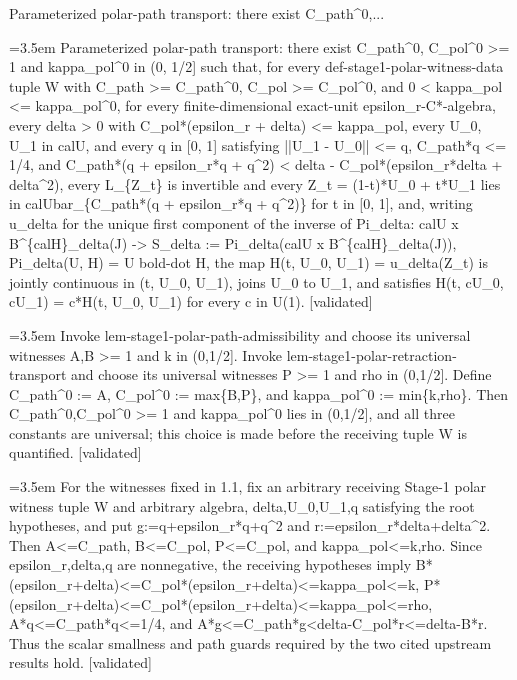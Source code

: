 \documentclass{article}
\newcommand{\step}[1]{\par\noindent\hangindent=3.5em\hangafter=1%
  \makebox[3.5em][l]{\textbf{#1.}}}
\newcommand{\steptag}[1]{\hfill{\small\textsf{[#1]}}}
\begin{document}
\begin{proofbox}{Parameterized polar-path transport: there exist C\_path\textasciicircum{}0,...}
\step{1} Parameterized polar-path transport: there exist C\_path\textasciicircum{}0, C\_pol\textasciicircum{}0 >= 1 and kappa\_pol\textasciicircum{}0 in (0, 1/2] such that, for every def-stage1-polar-witness-data tuple W with C\_path >= C\_path\textasciicircum{}0, C\_pol >= C\_pol\textasciicircum{}0, and 0 < kappa\_pol <= kappa\_pol\textasciicircum{}0, for every finite-dimensional exact-unit epsilon\_r-C*-algebra, every delta > 0 with C\_pol*(epsilon\_r + delta) <= kappa\_pol, every U\_0, U\_1 in calU, and every q in [0, 1] satisfying ||U\_1 - U\_0|| <= q, C\_path*q <= 1/4, and C\_path*(q + epsilon\_r*q + q\textasciicircum{}2) < delta - C\_pol*(epsilon\_r*delta + delta\textasciicircum{}2), every L\_\{Z\_t\} is invertible and every Z\_t = (1-t)*U\_0 + t*U\_1 lies in calUbar\_\{C\_path*(q + epsilon\_r*q + q\textasciicircum{}2)\} for t in [0, 1], and, writing u\_delta for the unique first component of the inverse of Pi\_delta: calU x B\textasciicircum{}\{calH\}\_delta(J) -> S\_delta := Pi\_delta(calU x B\textasciicircum{}\{calH\}\_delta(J)), Pi\_delta(U, H) = U bold-dot H, the map H(t, U\_0, U\_1) = u\_delta(Z\_t) is jointly continuous in (t, U\_0, U\_1), joins U\_0 to U\_1, and satisfies H(t, cU\_0, cU\_1) = c*H(t, U\_0, U\_1) for every c in U(1). \steptag{validated} \\[6pt]
\step{1.1} Invoke lem-stage1-polar-path-admissibility and choose its universal witnesses A,B >= 1 and k in (0,1/2]. Invoke lem-stage1-polar-retraction-transport and choose its universal witnesses P >= 1 and rho in (0,1/2]. Define C\_path\textasciicircum{}0 := A, C\_pol\textasciicircum{}0 := max\{B,P\}, and kappa\_pol\textasciicircum{}0 := min\{k,rho\}. Then C\_path\textasciicircum{}0,C\_pol\textasciicircum{}0 >= 1 and kappa\_pol\textasciicircum{}0 lies in (0,1/2], and all three constants are universal; this choice is made before the receiving tuple W is quantified. \steptag{validated} \\[4pt]
\step{1.2} For the witnesses fixed in 1.1, fix an arbitrary receiving Stage-1 polar witness tuple W and arbitrary algebra, delta,U\_0,U\_1,q satisfying the root hypotheses, and put g:=q+epsilon\_r*q+q\textasciicircum{}2 and r:=epsilon\_r*delta+delta\textasciicircum{}2. Then A<=C\_path, B<=C\_pol, P<=C\_pol, and kappa\_pol<=k,rho. Since epsilon\_r,delta,q are nonnegative, the receiving hypotheses imply B*(epsilon\_r+delta)<=C\_pol*(epsilon\_r+delta)<=kappa\_pol<=k, P*(epsilon\_r+delta)<=C\_pol*(epsilon\_r+delta)<=kappa\_pol<=rho, A*q<=C\_path*q<=1/4, and A*g<=C\_path*g<delta-C\_pol*r<=delta-B*r. Thus the scalar smallness and path guards required by the two cited upstream results hold. \steptag{validated} \\[4pt]

\end{proofbox}
\end{document}
